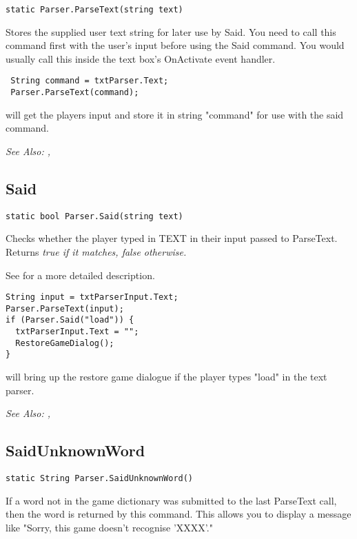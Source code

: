 \begin{verbatim}
static Parser.ParseText(string text)
\end{verbatim}
Stores the supplied user text string for later use by Said.
You need to call this command first with the user's input before using
the Said command. You would usually call this inside the text box's
OnActivate event handler.

\begin{verbatim}
 String command = txtParser.Text;
 Parser.ParseText(command);
\end{verbatim}
will get the players input and store it in string "command" for use with the said command.

\it{See Also:} ,


\subsection{Said}\label{Parser.Said}%

\begin{verbatim}
static bool Parser.Said(string text)
\end{verbatim}
Checks whether the player typed in TEXT in their input passed to ParseText.
Returns \it{true} if it matches, \it{false} otherwise.

See  for a more detailed description.


\begin{verbatim}
String input = txtParserInput.Text;
Parser.ParseText(input);
if (Parser.Said("load")) {
  txtParserInput.Text = "";
  RestoreGameDialog();
}
\end{verbatim}
will bring up the restore game dialogue if the player types "load" in the text parser.

\it{See Also:} , 


\subsection{SaidUnknownWord}\label{Parser.SaidUnknownWord}%

\begin{verbatim}
static String Parser.SaidUnknownWord()
\end{verbatim}
If a word not in the game dictionary was submitted to the last ParseText
call, then the word is returned by this command. This allows you to display a
message like "Sorry, this game doesn't recognise 'XXXX'."

